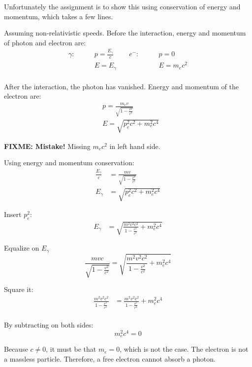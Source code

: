 \documentclass[a4paper,german,12pt,smallheadings]{scrartcl}
\begin{document}
\begin{enumerate}[a)]
    Unfortunately the assignment is to show this using conservation of energy
    and momentum, which takes a few lines.

    Assuming non-relativistic speeds. Before the interaction, energy and momentum of photon and electron are:
    \begin{align*}
      \gamma: \quad \quad & p = \frac{E_\gamma}{c}  &\quad e^-: \quad \quad & p = 0 \\
                          & E = E_\gamma &                & E = m_ec^2 \\
    \end{align*}

    After the interaction, the photon has vanished. Energy and momentum of the
    electron are:
    \begin{align*}
      &p = \frac{m_ev}{\sqrt{1-\frac{v^2}{c^2}}} \\
      &E = \sqrt{p_e^2c^2 + m_e^2 c^4}
    \end{align*}

    \textbf{FIXME: Mistake!} Missing $m_ec^2$ in left hand side.

    Using energy and momentum conservation:
    \begin{align*}
      \frac{E_\gamma}{c} &= \frac{mv}{\sqrt{1- \frac{v^2}{c^2}}} \\
      E_\gamma &= \sqrt{p_e^2c^2 + m_e^2c^4}
    \end{align*}

    Insert $p_e^2$:
    \begin{align*}
      E_\gamma &= \sqrt{\frac{m^2v^2c^2}{1-\frac{v^2}{c^2}} + m_e^2c^4}
    \end{align*}

    Equalize on $E_\gamma$
    \begin{equation*}
      \frac{mvc}{\sqrt{1 - \frac{v^2}{c^2}}} = \sqrt{\frac{m^2v^2c^2}{1-\frac{v^2}{c^2}} + m_e^2c^4}
    \end{equation*}

    Square it:
    \begin{align*}
      \frac{m^2v^2c^2}{1 - \frac{v^2}{c^2}} &= \frac{m^2v^2c^2}{1-\frac{v^2}{c^2}} + m_e^2c^4 \\
    \end{align*}

    By subtracting on both sides:
    \begin{equation*}
      m_e^2c^4 = 0
    \end{equation*}

    Because $c \neq 0$, it must be that $m_e = 0$, which is not the case. The electron is not a
    massless particle. Therefore, a free electron cannot absorb a photon.


\end{enumerate}
\end{document}
